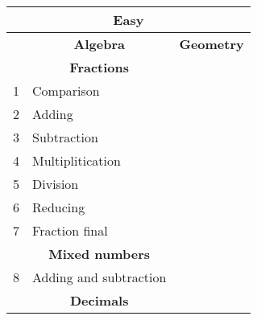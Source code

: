 \documentclass[a4paper]{article}
\begin{document}
\begin{center}

\begin{longtable}{|lll|}
    \hline
    \multicolumn{3}{|c|}{\textbf{Easy}}                                                                                                       \\ \hline
    \endfirsthead
    \endhead
    \multicolumn{1}{|l|}{}   & \multicolumn{1}{c|}{\textbf{Algebra}}                  & \multicolumn{1}{c|}{\textbf{Geometry}}                \\ \hline
    \multicolumn{1}{|l|}{}   & \multicolumn{1}{c|}{\textbf{Fractions}}                &                                                       \\ \hline
    \multicolumn{1}{|l|}{1}  & \multicolumn{1}{l|}{Comparison}                        &                                                       \\ \hline
    \multicolumn{1}{|l|}{2}  & \multicolumn{1}{l|}{Adding}                            &                                                       \\ \hline
    \multicolumn{1}{|l|}{3}  & \multicolumn{1}{l|}{Subtraction}                       &                                                       \\ \hline
    \multicolumn{1}{|l|}{4}  & \multicolumn{1}{l|}{Multiplitication}                  &                                                       \\ \hline
    \multicolumn{1}{|l|}{5}  & \multicolumn{1}{l|}{Division}                          &                                                       \\ \hline
    \multicolumn{1}{|l|}{6}  & \multicolumn{1}{l|}{Reducing}                          &                                                       \\ \hline
    \multicolumn{1}{|l|}{7}  & \multicolumn{1}{l|}{Fraction final}                    &                                                       \\ \hline
    \multicolumn{1}{|l|}{}   & \multicolumn{1}{c|}{\textbf{Mixed numbers}}            &                                                       \\ \hline
    \multicolumn{1}{|l|}{8}  & \multicolumn{1}{l|}{Adding and subtraction}            &                                                       \\ \hline
    \multicolumn{1}{|l|}{}   & \multicolumn{1}{c|}{\textbf{Decimals}}                 &                                                       \\ \hline

\end{longtable}
\end{center}
\end{document}
